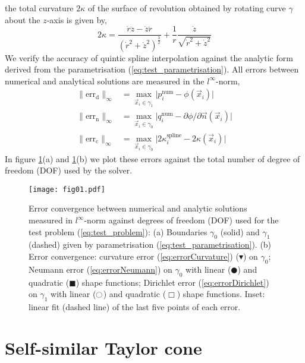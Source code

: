 \documentclass{jfm}
\begin{document}
the total curvature $2\kappa$ of the surface of revolution obtained by rotating curve $\gamma$
about the $z$-axis is given by,
\begin{equation}
2\kappa= \frac{\dot{r}\ddot{z} - \dot{z}\ddot{r}}{(\dot{r}^2+\dot{z}^2)^{\frac{3}{2}}}
+\frac{1}{r}\frac{\dot{z}}{\sqrt{\dot{r}^2+\dot{z}^2}}
\end{equation}
We verify the accuracy of quintic spline interpolation against the analytic form derived from
the parametrisation (\ref{eq:test_parametrisation}). All errors between numerical and analytical solutions
are measured in the $l^\infty$-norm,
\begin{align}
\|\textrm{err}_\mathrm{d}\|_\infty &= 
\max_{\vec{x}_i\in \gamma_1}{\lvert p^\mathrm{num}_i-\phi(\vec{x}_i)\rvert}\label{eq:errorDirichlet}\\
\|\textrm{err}_\mathrm{n}\|_\infty &= 
\max_{\vec{x}_i\in \gamma_0}{\lvert q^\mathrm{num}_i-\partial\phi/\partial\vec{n}(\vec{x}_i)\rvert}\label{eq:errorNeumann}\\
\|\textrm{err}_\mathrm{c}\|_\infty &= 
\max_{\vec{x}_i\in \gamma_0}{\lvert 2\kappa^\mathrm{spline}_i-2\kappa(\vec{x}_i)\rvert}\label{eq:errorCurvature}
\end{align}
In figure \ref{fig:test_result}(a) and \ref{fig:test_result}(b) 
we plot these errors against the total number of degree of freedom (DOF) used by the solver.
\begin{figure}
  \centering
  \texttt{[image: fig01.pdf]}%
  \caption{
Error convergence  between numerical and analytic solutions measured in $l^\infty$-norm against degrees of freedom (DOF) used for the test problem (\ref{eq:test_problem}):
(a) Boundaries $\gamma_0$ (solid) and $\gamma_1$ (dashed) given 
by parametrisation (\ref{eq:test_parametrisation}).
(b) Error convergence: curvature error (\ref{eq:errorCurvature}) ($\blacktriangledown$) on $\gamma_0$;
Neumann error (\ref{eq:errorNeumann}) on $\gamma_0$ 
with linear ($\CIRCLE $) and quadratic ($\blacksquare$) shape functions;
Dirichlet error (\ref{eq:errorDirichlet})  on $\gamma_1$ 
with linear ($\ocircle $) and quadratic ($\Box$) shape functions.
Inset: linear fit (dashed line) of the last five points of each error.
  }
\label{fig:test_result}
\end{figure}

\section{Self-similar Taylor cone}
\end{document}
